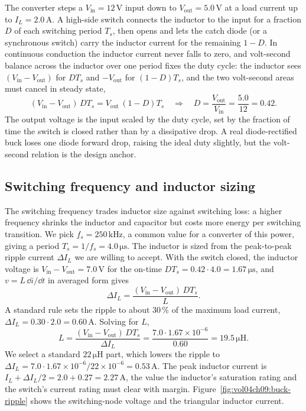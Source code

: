 The converter steps a $V_{\text{in}} = 12\,\si{\volt}$ input down to
$V_{\text{out}} = 5.0\,\si{\volt}$ at a load current up to $I_{L} =
2.0\,\si{\ampere}$. A high-side switch connects the inductor to the input
for a fraction $D$ of each switching period $T_{s}$, then opens and lets
the catch diode (or a synchronous switch) carry the inductor current for
the remaining $1-D$. In continuous conduction the inductor current never
falls to zero, and volt-second balance across the inductor over one
period fixes the duty cycle: the inductor sees $(V_{\text{in}}-V_{\text{
out}})$ for $DT_{s}$ and $-V_{\text{out}}$ for $(1-D)T_{s}$, and the two
volt-second areas must cancel in steady state,
\[
(V_{\text{in}}-V_{\text{out}})\,DT_{s} = V_{\text{out}}\,(1-D)T_{s}
\quad\Longrightarrow\quad
D = \frac{V_{\text{out}}}{V_{\text{in}}} = \frac{5.0}{12} = 0.42.
\]
The output voltage is the input scaled by the duty cycle, set by the
fraction of time the switch is closed rather than by a dissipative drop.
A real diode-rectified buck loses one diode forward drop, raising the
ideal duty slightly, but the volt-second relation is the design anchor.

\subsection{Switching frequency and inductor sizing}

The switching frequency trades inductor size against switching loss: a
higher frequency shrinks the inductor and capacitor but costs more energy
per switching transition. We pick $f_{s} = 250\,\si{\kilo\hertz}$, a
common value for a converter of this power, giving a period $T_{s} =
1/f_{s} = 4.0\,\si{\micro\second}$. The inductor is sized from the
peak-to-peak ripple current $\Delta I_{L}$ we are willing to accept. With
the switch closed, the inductor voltage is $V_{\text{in}}-V_{\text{out}} =
7.0\,\si{\volt}$ for the on-time $DT_{s} = 0.42\cdot 4.0 = 1.67\,\si{\micro
\second}$, and $v = L\,\dd i/\dd t$ in averaged form gives
\[
\Delta I_{L} = \frac{(V_{\text{in}}-V_{\text{out}})\,DT_{s}}{L}.
\]
A standard rule sets the ripple to about $30\,\%$ of the maximum load
current, $\Delta I_{L} = 0.30\cdot 2.0 = 0.60\,\si{\ampere}$. Solving for
$L$,
\[
L = \frac{(V_{\text{in}}-V_{\text{out}})\,DT_{s}}{\Delta I_{L}}
= \frac{7.0\cdot 1.67\times 10^{-6}}{0.60}
= 19.5\,\si{\micro\henry}.
\]
We select a standard $22\,\si{\micro\henry}$ part, which lowers the ripple
to $\Delta I_{L} = 7.0\cdot 1.67\times 10^{-6}/22\times 10^{-6} = 0.53\,
\si{\ampere}$. The peak inductor current is $I_{L}+\Delta I_{L}/2 = 2.0 +
0.27 = 2.27\,\si{\ampere}$, the value the inductor's saturation rating and
the switch's current rating must clear with margin.
Figure~\ref{fig:vol04ch09:buck-ripple} shows the switching-node voltage and
the triangular inductor current.

